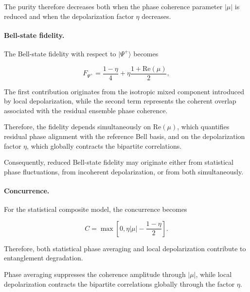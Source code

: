 The purity therefore decreases both when the phase coherence parameter \( |\mu| \) is reduced and when the depolarization factor \( \eta \) decreases.

\medskip

\paragraph{Bell-state fidelity.}

The Bell-state fidelity with respect to \( |\Psi^+\rangle \) becomes

\begin{equation}
F_{\Psi^+}
=
\frac{1-\eta}{4}
+
\eta
\frac{1+\mathrm{Re}(\mu)}{2},
\label{eq:ensemble_composite_fidelity}
\end{equation}

\medskip

The first contribution originates from the isotropic mixed component introduced by local depolarization, while the second term represents the coherent overlap associated with the residual ensemble phase coherence.

\medskip

Therefore, the fidelity depends simultaneously on \( \mathrm{Re}(\mu) \), which quantifies residual phase alignment with the reference Bell basis, and on the depolarization factor \( \eta \), which globally contracts the bipartite correlations.

\medskip

Consequently, reduced Bell-state fidelity may originate either from statistical phase fluctuations, from incoherent depolarization, or from both simultaneously.

\medskip

\paragraph{Concurrence.}

For the statistical composite model, the concurrence becomes

\begin{equation}
C
=
\max
\left[
0,
\eta|\mu|
-
\frac{1-\eta}{2}
\right].
\label{eq:ensemble_composite_concurrence}
\end{equation}

Therefore, both statistical phase averaging and local depolarization contribute to entanglement degradation.

\medskip

Phase averaging suppresses the coherence amplitude through \( |\mu| \), while local depolarization contracts the bipartite correlations globally through the factor \( \eta \).

